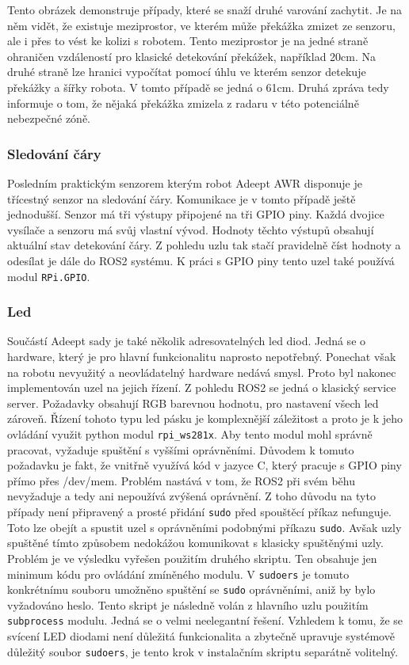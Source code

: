 Tento obrázek demonstruje případy, které se snaží druhé varování zachytit. Je na něm vidět, že existuje meziprostor, ve kterém může překážka zmizet ze senzoru, ale i přes to vést ke kolizi s robotem. Tento meziprostor je na jedné straně ohraničen vzdáleností pro klasické detekování překážek, například 20cm. Na druhé straně lze hranici vypočítat pomocí úhlu ve kterém senzor detekuje překážky a šířky robota.
V tomto případě se jedná o 61cm. Druhá zpráva tedy informuje o tom, že nějaká překážka zmizela z radaru v této potenciálně nebezpečné zóně.

\subsubsection*{Sledování čáry}
Posledním praktickým senzorem kterým robot Adeept AWR disponuje je třícestný senzor na sledování čáry.
Komunikace je v tomto případě ještě jednodušší. Senzor má tři výstupy připojené na tři GPIO piny. Každá dvojice vysílače a senzoru má svůj vlastní vývod. Hodnoty těchto výstupů obsahují aktuální stav detekování čáry. Z pohledu uzlu tak stačí pravidelně číst hodnoty a odesílat je dále do ROS2 systému. K práci s GPIO piny tento uzel také používá modul \verb|RPi.GPIO|.

\subsubsection*{Led}
Součástí Adeept sady je také několik adresovatelných led diod. Jedná se o hardware, který je pro hlavní funkcionalitu naprosto nepotřebný. Ponechat však na robotu nevyužitý a neovládatelný hardware nedává smysl. Proto byl nakonec implementován uzel na jejich řízení. Z pohledu ROS2 se jedná o klasický service server. Požadavky obsahují RGB barevnou hodnotu, pro nastavení všech led zároveň. Řízení tohoto typu led pásku je komplexnější záležitost a proto je k jeho ovládání využit python modul \verb|rpi_ws281x|. 
Aby tento modul mohl správně pracovat, vyžaduje spuštění s vyššími oprávněními. Důvodem k tomuto požadavku je fakt, že vnitřně využívá kód v jazyce C, který pracuje s GPIO piny přímo přes /dev/mem. Problém nastává v tom, že ROS2 při svém běhu nevyžaduje a tedy ani nepoužívá zvýšená oprávnění. Z toho důvodu na tyto případy není připravený a prosté přidání \verb|sudo| před spouštěcí příkaz nefunguje. Toto lze obejít a spustit uzel s oprávněními podobnými příkazu \verb|sudo|. Avšak uzly spuštěné tímto způsobem nedokážou komunikovat s klasicky spuštěnými uzly. 
Problém je ve výsledku vyřešen použitím druhého skriptu. Ten obsahuje jen minimum kódu pro ovládání zmíněného modulu. V \verb|sudoers| je tomuto konkrétnímu souboru umožněno spuštění se \verb|sudo| oprávněními, aniž by bylo vyžadováno heslo. Tento skript je následně volán z hlavního uzlu použitím \verb|subprocess| modulu. Jedná se o velmi neelegantní řešení. Vzhledem k tomu, že se svícení LED diodami není důležitá funkcionalita a zbytečně upravuje systémově důležitý soubor \verb|sudoers|, je tento krok v instalačním skriptu separátně volitelný.

